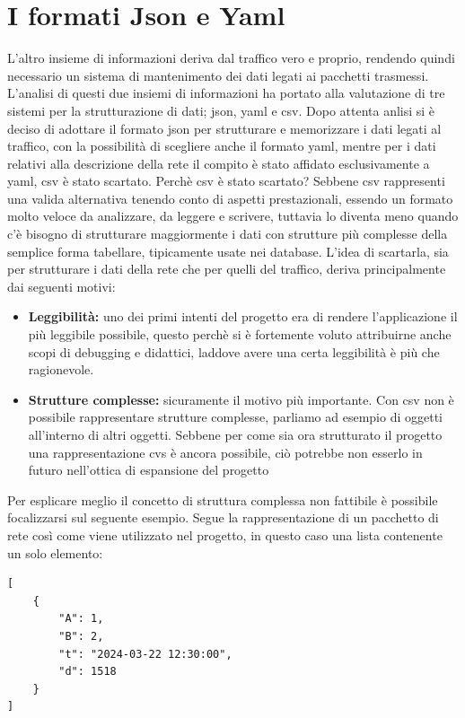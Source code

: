 \documentclass[binding=0.6cm]{sapthesis}
\begin{document}
\section{I formati Json e Yaml}
L'altro insieme di informazioni deriva dal traffico vero e proprio, rendendo quindi necessario un sistema di mantenimento dei dati legati ai pacchetti trasmessi. L'analisi di questi due insiemi di informazioni ha portato alla valutazione di tre sistemi per la strutturazione di dati; json\cite{RFC791}, yaml\cite{RFC9512} e csv\cite{RFC4180}.
Dopo attenta anlisi si è deciso di adottare il formato json per strutturare e memorizzare i dati legati al traffico, con la possibilità di scegliere anche il formato yaml, mentre per i dati relativi alla descrizione della rete il compito è stato affidato esclusivamente a yaml, csv è stato scartato.
Perchè csv è stato scartato? Sebbene csv rappresenti una valida alternativa tenendo conto di aspetti prestazionali, essendo un formato molto veloce da analizzare, da leggere e scrivere, tuttavia lo diventa meno quando c'è bisogno di strutturare maggiormente i dati con strutture più complesse della semplice forma tabellare, tipicamente usate nei database. 
L'idea di scartarla, sia per strutturare i dati della rete che per quelli del traffico, deriva principalmente dai seguenti motivi:

\begin{itemize}
    \item \textbf{Leggibilità:} uno dei primi intenti del progetto era di rendere l'applicazione il più leggibile possibile, questo perchè si è
    fortemente voluto attribuirne anche scopi di debugging e didattici, laddove avere una certa leggibilità è più che ragionevole.
    \item \textbf{Strutture complesse:} sicuramente il motivo più importante. Con csv non è possibile rappresentare strutture complesse, parliamo ad esempio di oggetti
    all'interno di altri oggetti. Sebbene per come sia ora strutturato il progetto una rappresentazione cvs è ancora possibile, ciò potrebbe non esserlo in futuro
    nell'ottica di espansione del progetto
\end{itemize}
Per esplicare meglio il concetto di struttura complessa non fattibile è possibile focalizzarsi
 sul seguente esempio. Segue la rappresentazione di un pacchetto di rete così come viene
 utilizzato nel progetto, in questo caso una lista contenente un solo elemento:

 {\scriptsize %
\begin{lstlisting}[caption={pacchetto di rete rappresentato in json}, label={fig:packet_example}]
[    
    {
        "A": 1,
        "B": 2,
        "t": "2024-03-22 12:30:00",
        "d": 1518
    }
]
\end{lstlisting}
 }
\end{document}
